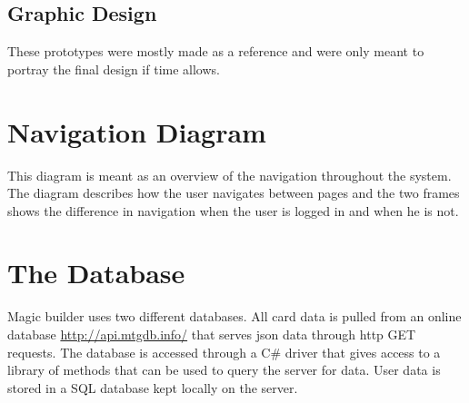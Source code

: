 \documentclass[paper=a4, fontsize=11pt]{scrartcl} %
\numberwithin{equation}{section} %
\numberwithin{figure}{section} %
\numberwithin{table}{section} %
\begin{document}
\subsection{Graphic Design}
These prototypes were mostly made as a reference and were only meant to portray the final design if time allows.
\begin{center}
\end{center}

\section{Navigation Diagram}
This diagram is meant as an overview of the navigation throughout the system. The diagram describes how the user navigates between pages and the two frames shows the difference in navigation when the user is logged in and when he is not.
\begin{center}
\end{center}

\section{The Database}
Magic builder uses two different databases. All card data is pulled from an online database \href{http://api.mtgdb.info/}{http://api.mtgdb.info/} that serves json data through http GET requests. The database is accessed through a C\# driver that gives access to a library of methods that can be used to query the server for data. User data is stored in a SQL database kept locally on the server.
\end{document}
